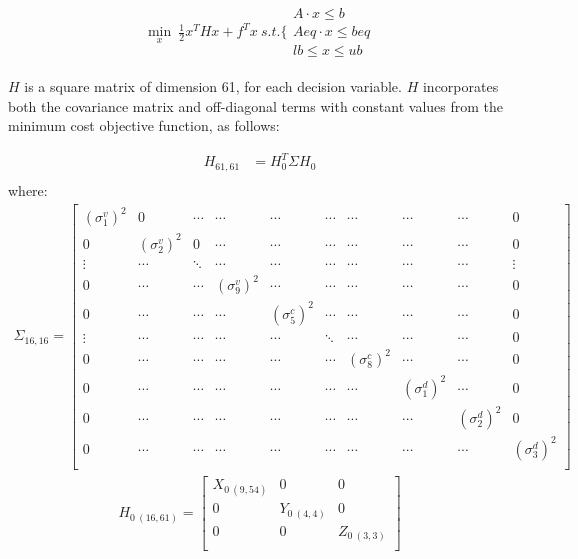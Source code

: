 \documentclass{article}
\begin{document}
	\begin{align*}
		\underset{x}{\min} \ \frac{1}{2} x^T H x + f^T x\ 
		s.t. \Bigg\{ \substack{
		A \cdot x  \leq b \\
		Aeq \cdot x \leq beq \\
		lb \leq x \leq ub}
	\end{align*}
	
	$H$ is a square matrix of dimension 61, for each decision variable. $H$ incorporates both the covariance matrix and off-diagonal terms with constant values from the minimum cost objective function, as follows:
	
	\begin{align*}
		H_{61,61} &= H_0^T \Sigma H_0 \\
	\end{align*}
		where:
	\begin{align*}
		\Sigma_{16,16} = \begin{bmatrix} 
			(\sigma_1^v)^2 & 0 & \cdots & \cdots & \cdots & \cdots & \cdots & \cdots & \cdots & 0 \\
			0 & (\sigma_2^v)^2 & 0 & \cdots & \cdots & \cdots & \cdots & \cdots & \cdots & 0\\
			\vdots & \cdots & \ddots & \cdots & \cdots & \cdots & \cdots & \cdots & \cdots & \vdots \\
			0 & \cdots & \cdots & (\sigma_9^v)^2 & \cdots & \cdots & \cdots & \cdots & \cdots & 0\\
			0 & \cdots & \cdots & \cdots & (\sigma_5^c)^2 & \cdots & \cdots & \cdots & \cdots & 0\\
			\vdots & \cdots & \cdots & \cdots & \cdots & \ddots & \cdots & \cdots & \cdots & 0\\
			0 & \cdots & \cdots & \cdots & \cdots & \cdots & (\sigma_8^c)^2 & \cdots & \cdots & 0 \\
			0 & \cdots & \cdots & \cdots & \cdots & \cdots & \cdots & (\sigma_1^d)^2 & \cdots & 0 \\
			0 & \cdots & \cdots & \cdots & \cdots & \cdots & \cdots & \cdots & (\sigma_2^d)^2 & 0 \\
			0 & \cdots & \cdots & \cdots & \cdots & \cdots & \cdots & \cdots & \cdots & (\sigma_3^d)^2\\
			\end{bmatrix} \end{align*}
	\begin{align*}
		H_{0 \ (16,61)} = \begin{bmatrix}
				X_{0 \ (9,54)} & 0 & 0 \\
				0 & Y_{0 \ (4,4)} & 0 \\
				0 & 0 & Z_{0 \ (3,3)} \\ 
			\end{bmatrix}
	\end{align*}
\end{document}
